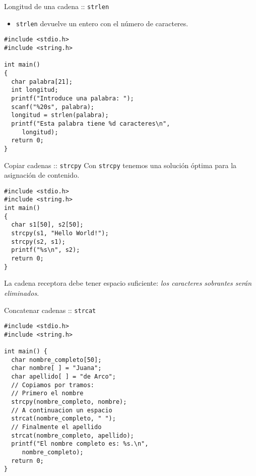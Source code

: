 \documentclass[xcolor={usenames,svgnames,dvipsnames}, aspectratio=169]{beamer}
\begin{document}
\begin{frame}[label={sec:org0aabdc7},fragile]{Longitud de una cadena :: \texttt{strlen}}
 \begin{itemize}
\item \texttt{strlen} devuelve un entero con el número de caracteres.
\end{itemize}
\lstset{language=C,label= ,caption= ,captionpos=b,numbers=none}
\begin{lstlisting}
#include <stdio.h>
#include <string.h>

int main()
{
  char palabra[21];
  int longitud;
  printf("Introduce una palabra: ");
  scanf("%20s", palabra);
  longitud = strlen(palabra);
  printf("Esta palabra tiene %d caracteres\n",
	 longitud);
  return 0;
}
\end{lstlisting}
\end{frame}


\begin{frame}[label={sec:orge82e840},fragile]{Copiar cadenas :: \texttt{strcpy}}
 Con \texttt{strcpy} tenemos una solución óptima para la \alert{asignación de contenido}.

\lstset{language=C,label= ,caption= ,captionpos=b,numbers=none}
\begin{lstlisting}
#include <stdio.h>
#include <string.h>
int main()
{
  char s1[50], s2[50];
  strcpy(s1, "Hello World!");
  strcpy(s2, s1);
  printf("%s\n", s2);
  return 0;
}
\end{lstlisting}

\begin{block}{}
La cadena receptora debe tener espacio suficiente: \emph{los caracteres sobrantes serán eliminados}.
\end{block}
\end{frame}

\begin{frame}[label={sec:orgdaa07f7},fragile]{Concatenar cadenas :: \texttt{strcat}}
 \lstset{language=C,label= ,caption= ,captionpos=b,numbers=none}
\begin{lstlisting}
#include <stdio.h>
#include <string.h>

int main() {
  char nombre_completo[50];
  char nombre[ ] = "Juana";
  char apellido[ ] = "de Arco";
  // Copiamos por tramos:
  // Primero el nombre
  strcpy(nombre_completo, nombre);
  // A continuacion un espacio
  strcat(nombre_completo, " ");
  // Finalmente el apellido
  strcat(nombre_completo, apellido);
  printf("El nombre completo es: %s.\n",
	 nombre_completo);
  return 0;
}
\end{lstlisting}
\end{frame}
\end{document}
